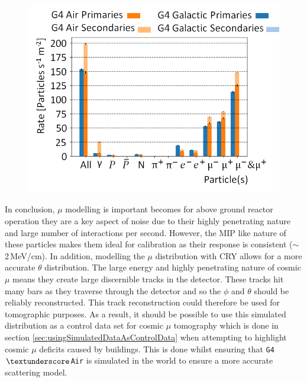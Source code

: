 \begin{figure}[!h]
 \centering
 \includegraphics[width=0.7\linewidth]{Chapter4/Figs/Raster/CryPlots/CRY_ratesMedText.png}
 \label{fig:CRY_rates}
\end{figure}

In conclusion, $\mu$ modelling is important becomes for above ground reactor operation they are a key aspect of noise due to their highly penetrating nature and large number of interactions per second. However, the MIP like nature of these particles makes them ideal for calibration as their response is consistent ($\sim$ 2\,MeV/cm). In addition, modelling the $\mu$ distribution with CRY \cite{ieee_cry_2007} allows for a more accurate $\theta$ distribution. The large energy and highly penetrating nature of cosmic $\mu$ means they create large discernible tracks in the detector. These tracks hit many bars as they traverse through the detector and so the $\phi$ and $\theta$ should be reliably reconstructed. This track reconstruction could therefore be used for tomographic purposes. As a result, it should be possible to use this simulated distribution as a control data set for cosmic $\mu$ tomography which is done in section \ref{sec:usingSimulatedDataAsControlData} when attempting to highlight cosmic $\mu$ deficits caused by buildings. This is done whilst ensuring that \texttt{G4$\textunderscore$Air} is simulated in the world to ensure a more accurate scattering model. 

